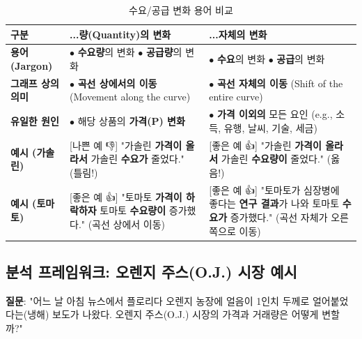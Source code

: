 \documentclass[11pt,a4paper]{article}
\theoremstyle{definition}
\begin{document}
\begin{table}[h!]
\centering
\caption{수요/공급 변화 용어 비교}
\label{tab:shift_vs_move}
\begin{tabularx}{\textwidth}{>{\raggedright}p{3.5cm} >{\raggedright}X >{\raggedright}X}
\toprule
\textbf{구분} & \textbf{...량(Quantity)의 변화} & \textbf{...자체의 변화} \\
\midrule
\textbf{용어 (Jargon)} & $\bullet$ \textbf{수요량}의 변화 \newline $\bullet$ \textbf{공급량}의 변화 & $\bullet$ \textbf{수요}의 변화 \newline $\bullet$ \textbf{공급}의 변화 \\
\textbf{그래프 상의 의미} & $\bullet$ \textbf{곡선 상에서의 이동} \newline (Movement along the curve) & $\bullet$ \textbf{곡선 자체의 이동} \newline (Shift of the entire curve) \\
\textbf{유일한 원인} & $\bullet$ 해당 상품의 \textbf{가격(P) 변화} & $\bullet$ \textbf{가격 이외의} 모든 요인 \newline (e.g., 소득, 유행, 날씨, 기술, 세금) \\
\textbf{예시 (가솔린)} & [나쁜 예 👎] \newline "가솔린 \textbf{가격이 올라서} 가솔린 \textbf{수요가} 줄었다." \newline (틀림!) & [좋은 예 👍] \newline "가솔린 \textbf{가격이 올라서} 가솔린 \textbf{수요량이} 줄었다." \newline (옳음!) \\
\textbf{예시 (토마토)} & [좋은 예 👍] \newline "토마토 \textbf{가격이 하락하자} 토마토 \textbf{수요량이} 증가했다." \newline (곡선 상에서 이동) & [좋은 예 👍] \newline "토마토가 심장병에 좋다는 \textbf{연구 결과}가 나와 토마토 \textbf{수요가} 증가했다." \newline (곡선 자체가 오른쪽으로 이동) \\
\bottomrule
\end{tabularx}
\end{table}

\subsection{분석 프레임워크: 오렌지 주스(O.J.) 시장 예시}

\textbf{질문}: "어느 날 아침 뉴스에서 플로리다 오렌지 농장에 얼음이 1인치 두께로 얼어붙었다는(냉해) 보도가 나왔다. 오렌지 주스(O.J.) 시장의 가격과 거래량은 어떻게 변할까?"
\end{document}
